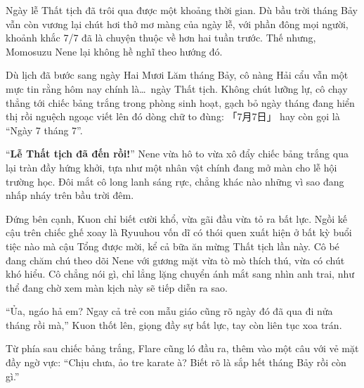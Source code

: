 \documentclass[../main.tex]{subfiles}
\begin{document}

Ngày lễ Thất tịch đã trôi qua được một khoảng thời gian. Dù bầu trời tháng Bảy vẫn còn vương lại chút hơi thở mơ màng của ngày lễ, với phần đông mọi người, khoảnh khắc 7/7 đã là chuyện thuộc về hơn hai tuần trước. Thế nhưng, Momosuzu Nene lại không hề nghĩ theo hướng đó.

Dù lịch đã bước sang ngày Hai Mươi Lăm tháng Bảy, cô nàng Hải cẩu vẫn một mực tin rằng hôm nay chính là\dots\ ngày Thất tịch. Không chút lưỡng lự, cô chạy thẳng tới chiếc bảng trắng trong phòng sinh hoạt, gạch bỏ ngày tháng đang hiển thị rồi nguệch ngoạc viết lên đó dòng chữ to đùng: 「{\fotskip 7月7日}」 hay còn gọi là ``Ngày 7 tháng 7''.

``\textbf{Lễ Thất tịch đã đến rồi!}'' Nene vừa hô to vừa xô đẩy chiếc bảng trắng qua lại tràn đầy hứng khởi, tựa như một nhân vật chính đang mở màn cho lễ hội trường học. Đôi mắt cô long lanh sáng rực, chẳng khác nào những vì sao đang nhấp nháy trên bầu trời đêm.


Đứng bên cạnh, Kuon chỉ biết cười khổ, vừa gãi đầu vừa tỏ ra bất lực. Ngồi kế cậu trên chiếc ghế xoay là Ryuuhou vốn dĩ có thói quen xuất hiện ở bất kỳ buổi tiệc nào mà cậu Tổng được mời, kể cả bữa ăn mừng Thất tịch lần này. Cô bé đang chăm chú theo dõi Nene với gương mặt vừa tò mò thích thú, vừa có chút khó hiểu. Cô chẳng nói gì, chỉ lẳng lặng chuyển ánh mắt sang nhìn anh trai, như thể đang chờ xem màn kịch này sẽ tiếp diễn ra sao.

``Ủa, ngáo hả em? Ngay cả trẻ con mẫu giáo cũng rõ ngày đó đã qua đi nửa tháng rồi mà,'' Kuon thốt lên, giọng đầy sự bất lực, tay còn liên tục xoa trán.

Từ phía sau chiếc bảng trắng, Flare cũng ló đầu ra, thêm vào một câu với vẻ mặt đầy ngờ vực: ``Chịu chưa, ảo tre karate à? Biết rõ là sắp hết tháng Bảy rồi còn gì.''
\end{document}
